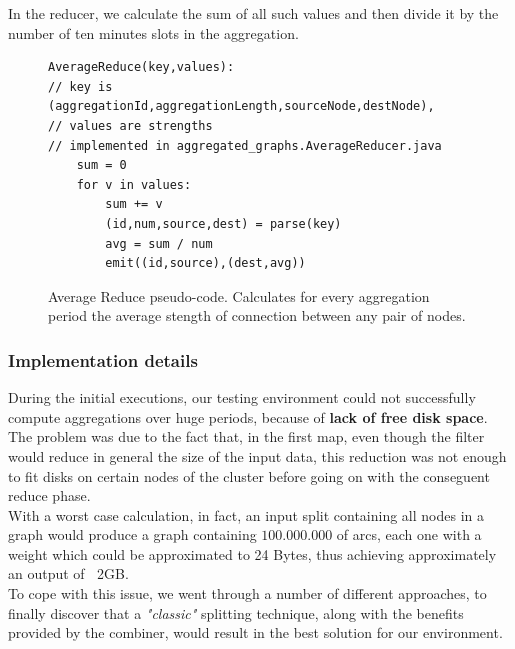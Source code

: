 In the reducer, we calculate the sum of all such values and then divide it by the number of ten minutes slots in the aggregation.
\begin{figure}[H]
\begin{verbatim}
AverageReduce(key,values):
// key is (aggregationId,aggregationLength,sourceNode,destNode), 
// values are strengths
// implemented in aggregated_graphs.AverageReducer.java
    sum = 0
    for v in values:
        sum += v
        (id,num,source,dest) = parse(key)
        avg = sum / num
        emit((id,source),(dest,avg))
\end{verbatim}
\caption{Average Reduce pseudo-code. Calculates for every aggregation period the average stength of connection between any pair of nodes.}
\label{fig:averagereduce}
\end{figure} 
\subsubsection{Implementation details}
During the initial executions, our testing environment
could not successfully compute aggregations over huge periods, because of \textbf{lack of free disk space}. \\
The problem was due to the fact that, in the first map, even though the filter would reduce in general the size of the input data,
this reduction was not enough to fit disks on certain nodes of the cluster before going on with the conseguent reduce phase.\\
With a worst case calculation, in fact, an input split containing all nodes in a graph would produce a graph containing $100.000.000$ of arcs, each one with a weight which could be approximated to 24 Bytes, thus achieving approximately an output of $~$ 2GB. \\
To cope with this issue, we went through a number of different approaches, to finally discover that a \emph{"classic"} splitting technique, along with the benefits provided by the combiner, would result in the best solution for our environment.
